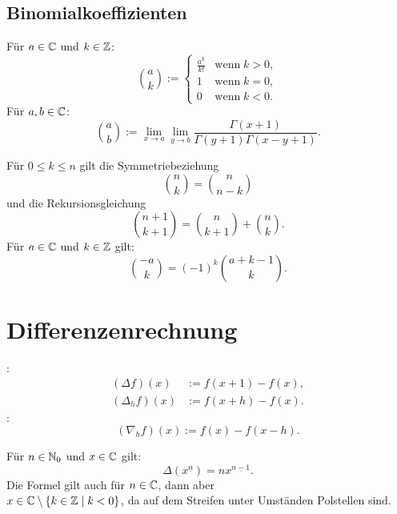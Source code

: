 \subsection{Binomialkoeffizienten}
\begin{definition}[Binomialkoeffizient]
Für $a\in\mathbb C$ und $k\in\mathbb Z$:
\begin{equation}
\binom{a}{k} := \begin{cases}
\frac{a^{\underline k}}{k!} & \text{wenn}\;k>0,\\
1 & \text{wenn}\;k=0,\\
0 & \text{wenn}\;k<0.
\end{cases}
\end{equation}
Für $a,b\in\mathbb C$:
\begin{equation}\label{eq:bc-allg}
\binom{a}{b} := \lim_{x\to a}\lim_{y\to b}
\frac{\Gamma(x+1)}{\Gamma(y+1)\Gamma(x-y+1)}.
\end{equation}
\end{definition}
\noindent
Für $0\le k\le n$ gilt die Symmetriebeziehung
\begin{equation}
\binom{n}{k} = \binom{n}{n-k}
\end{equation}
und die Rekursionsgleichung
\begin{equation}
\binom{n+1}{k+1} = \binom{n}{k+1}+\binom{n}{k}.
\end{equation}
Für $a\in\mathbb C$ und $k\in\mathbb Z$ gilt:
\begin{equation}
\binom{-a}{k} = (-1)^k \binom{a+k-1}{k}.
\end{equation}

\section{Differenzenrechnung}
\begin{definition}[Differenzoperator]
:
\begin{align}
(\Delta f)(x) &:= f(x+1)-f(x),\\
(\Delta_h f)(x) &:= f(x+h)-f(x).
\end{align}
:
\begin{equation}
(\nabla_h f)(x) := f(x)-f(x-h).
\end{equation}
\end{definition}
\noindent
Für $n\in\mathbb N_0$ und $x\in\mathbb C$ gilt:
\begin{equation}
\Delta(x^{\underline{n}}) = nx^{\underline{n-1}}.
\end{equation}
Die Formel gilt auch für $n\in\mathbb C$, dann aber\\
$x\in\mathbb C\setminus\{k\in\mathbb Z\mid k<0\}$, da auf dem Streifen unter
Umständen Polstellen sind.

